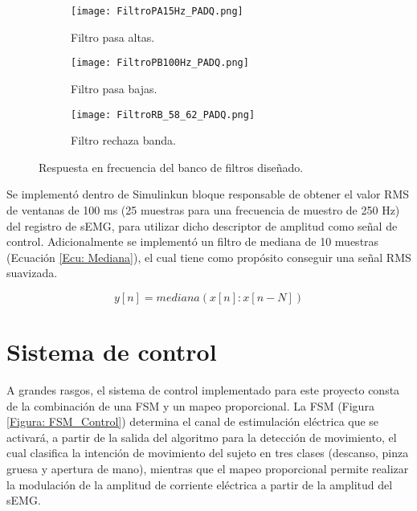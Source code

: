 \begin{figure}[htbp]
	\centering
	\begin{subfigure}[htbp]{0.7\textwidth}
		\texttt{[image: FiltroPA15Hz\_PADQ.png]}
		\caption{Filtro pasa altas.}
		\label{Figura: FiltroPA}
	\end{subfigure}
	
	\begin{subfigure}[htnp]{0.7\textwidth}
		\texttt{[image: FiltroPB100Hz\_PADQ.png]}
		\caption{Filtro pasa bajas.} 
		\label{Figura: FiltroPB}
	\end{subfigure}
	
	\begin{subfigure}[htbp]{0.7\textwidth}
		\texttt{[image: FiltroRB\_58\_62\_PADQ.png]}
		\caption{Filtro rechaza banda.}
		\label{Figura: FiltroRB}
	\end{subfigure}
	\caption{Respuesta en frecuencia del banco de filtros diseñado.}
	\label{Figura: Freqz_Filtros}
\end{figure}

Se implementó dentro de Simulink\textregistered un bloque responsable de obtener el valor RMS de ventanas de 100 ms (25 muestras para una frecuencia de muestro de 250 Hz) del registro de sEMG, para utilizar dicho descriptor de amplitud como señal de control. Adicionalmente se implementó un filtro de mediana de 10 muestras (Ecuación \ref{Ecu: Mediana}), el cual tiene como propósito conseguir una señal RMS suavizada.

\begin{equation}
	y[n] = mediana(x[n]:x[n-N])
	\label{Ecu: Mediana}
\end{equation}


\newpage
\section{Sistema de control}
A grandes rasgos, el sistema de control implementado para este proyecto consta de la combinación de una FSM y un mapeo proporcional. La FSM (Figura \ref{Figura: FSM_Control})  determina el canal de estimulación eléctrica que se activará, a partir de la salida del algoritmo para la detección de movimiento, el cual clasifica la intención de movimiento del sujeto en tres clases (descanso, pinza gruesa y apertura de mano), mientras que el mapeo proporcional permite realizar la modulación de la amplitud de corriente eléctrica a partir de la amplitud del sEMG.

